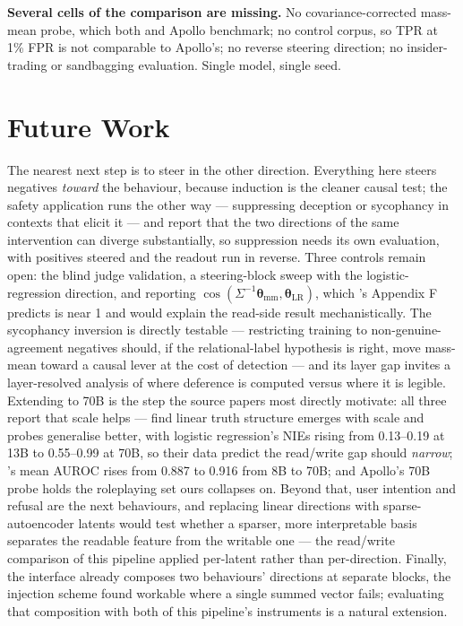 \documentclass[conference]{IEEEtran}
\begin{document}
\textbf{Several cells of the comparison are missing.} No covariance-corrected
mass-mean probe, which both
\citet{marks2024} and Apollo benchmark; no control corpus, so TPR at 1\% FPR is
not comparable to Apollo's; no reverse steering direction; no insider-trading or
sandbagging evaluation. Single model, single seed.

\section{Future Work}

The nearest next step is to steer in the other direction. Everything here
steers negatives \emph{toward} the behaviour, because induction is the cleaner
causal test; the safety application runs the other way --- suppressing deception
or sycophancy in contexts that elicit it --- and \citeauthor{marks2024} report
that the two directions of the same intervention can diverge substantially, so
suppression needs its own evaluation, with positives steered and the readout run
in reverse. Three controls remain open: the blind judge validation, a
steering-block sweep with the logistic-regression direction, and reporting
$\cos(\Sigma^{-1}\boldsymbol{\theta}_{\mathrm{mm}},
\boldsymbol{\theta}_{\mathrm{LR}})$, which \citeauthor{marks2024}'s Appendix F
predicts is near 1 and would explain the read-side result mechanistically. The
sycophancy inversion is directly testable --- restricting training to
non-genuine-agreement negatives should, if the relational-label hypothesis is
right, move mass-mean toward a causal lever at the cost of detection --- and its
layer gap invites a layer-resolved analysis of where deference is computed
versus where it is legible. Extending to 70B is the step the source papers most
directly motivate: all three report that scale helps ---
\citeauthor{marks2024} find linear truth structure emerges with scale and
probes generalise better, with logistic regression's NIEs rising from
0.13--0.19 at 13B to 0.55--0.99 at 70B, so their data predict the read/write
gap should \emph{narrow}; \citeauthor{mckenzie2025}'s mean AUROC rises from
0.887 to 0.916 from 8B to 70B; and Apollo's 70B probe holds the roleplaying
set ours collapses on. Beyond that, user intention and refusal are the next
behaviours, and replacing linear directions with sparse-autoencoder latents
\citep{cunningham2023,bricken2023} would test whether a sparser, more
interpretable basis separates the readable feature from the writable one ---
the read/write comparison of this pipeline applied per-latent rather than
per-direction. Finally, the interface already composes two behaviours'
directions at separate blocks, the injection scheme \citet{vanderweij2024}
found workable where a single summed vector fails; evaluating that composition
with both of this pipeline's instruments is a natural extension.
\end{document}
